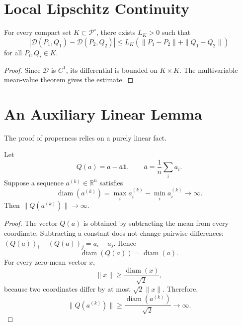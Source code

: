 \section{Local Lipschitz Continuity}\label{ch:sec:local-lipschitz-continuity}
\begin{theorem}
\label{ch:thm:23-4}
For every compact set \(K\subset\mathcal P^\circ\), there exists
\(L_K>0\) such that
\[ |\mathcal D(P_1,Q_1)-\mathcal D(P_2,Q_2)|
\le L_K(\|P_1-P_2\|+\|Q_1-Q_2\|) \]
for all \(P_i,Q_i\in K\).
\end{theorem}
\begin{proof} Since \(\mathcal D\) is \(C^{1}\), its differential is
bounded on \(K\times K\). The multivariable mean-value theorem
gives the estimate. 
\end{proof}
\section{An Auxiliary Linear Lemma}\label{ch:sec:an-auxiliary-linear-lemma}
The proof of properness relies on a purely linear fact.
\begin{lemma}
\label{ch:lem:23-5}
Let
\[ Q(a)=a-\bar a\mathbf 1, \qquad
\bar a=\frac1n\sum_i a_i. \]
Suppose a sequence \(a^{(k)}\in\mathbb R^n\) satisfies
\[ \operatorname{diam}(a^{(k)}) = \max_i
a_i^{(k)}-\min_i a_i^{(k)}
\longrightarrow\infty. \]
Then
$\|Q(a^{(k)})\|\longrightarrow\infty.$
\end{lemma}
\begin{proof} The vector \(Q(a)\) is obtained by subtracting the mean from
every coordinate. Subtracting a constant does not change pairwise
differences:
$(Q(a))_i-(Q(a))_j=a_i-a_j.$
Hence
\[ \operatorname{diam}(Q(a)) = \operatorname{diam}(a). \]
For every zero-mean vector \(x\),
\[ \|x\| \ge \frac{\operatorname{diam}(x)}{\sqrt 2}, \]
because two coordinates differ by at most \(\sqrt 2\|x\|\).
Therefore,
\[ \|Q(a^{(k)})\| \ge
\frac{\operatorname{diam}(a^{(k)})}{\sqrt 2}
\longrightarrow\infty. \]
\end{proof}
